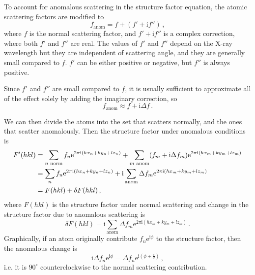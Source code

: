 \documentclass{article}
\theoremstyle{plain}\theoremheaderfont{\normalfont\itshape}\theorembodyfont{\rmfamily}\theoremseparator{.}\newtheorem*{rem}{Remark}\newtheorem*{ex}{Example}\newtheorem*{proof}{Proof}\newtheorem*{altp}{Alternative proof}
\theoremstyle{plain}\theoremheaderfont{\normalfont\bfseries}\theorembodyfont{\rmfamily}\theoremseparator{.}\newtheorem{thm}{Theorem}[section]\newtheorem{lem}[thm]{Lemma}\newtheorem{prop}[thm]{Proposition}\newtheorem*{cor}{Corollary}\newtheorem{defn}[thm]{Definition}\newtheorem{clm}[thm]{Claim}\newtheorem{clminproof}{Claim}\newtheorem*{law}{Law}\newtheorem{pos}[thm]{Postulate}
\theoremstyle{break}\theoremheaderfont{\normalfont\itshape}\theorembodyfont{\rmfamily}\theoremseparator{.\medskip}\newtheorem*{proofskip}{Proof}\newtheorem*{exs}{Examples}\newtheorem*{rems}{Remarks}
\theoremstyle{break}\theoremheaderfont{\normalfont\bfseries}\theorembodyfont{\rmfamily}\theoremseparator{.\medskip}\newtheorem{lemskip}[thm]{Lemma}\newtheorem{defnskip}[thm]{Definition}\newtheorem{propskip}[thm]{Proposition}\newtheorem{thmskip}[thm]{Theorem}
\numberwithin{equation}{section}
\newcommand{\ii}{\mathrm{i}}
\newcommand{\ee}{\mathrm{e}}
\begin{document}
    To account for anomalous scattering in the structure factor equation, the atomic scattering factors are modified to
    \begin{equation}
        f_{\text{anom}}=f+(f'+\ii f'')\,,
    \end{equation}
    where \(f\) is the normal scattering factor, and \(f'+\ii f''\) is a complex correction, where both \(f'\) and \(f''\) are real. The values of \(f'\) and \(f''\) depend on the X-ray wavelength but they are independent of scattering angle, and they are generally small compared to \(f\). \(f'\) can be either positive or negative, but \(f''\) is always positive.

    Since \(f'\) and \(f''\) are small compared to \(f\), it is usually sufficient to approximate all of the effect solely by adding the imaginary correction, so
    \begin{equation}
        f_{\text{anom}}\approx f+\ii\Delta f\,.
    \end{equation}

    We can then divide the atoms into the set that scatters normally, and the ones that scatter anomalously. Then the structure factor under anomalous conditions is
    \begin{align}
        F'(hkl)&=\sum_{n\text{ norm}}f_n \ee^{2\pi \ii(hx_n+ky_n+lz_n)}+\sum_{m\text{ anom}}(f_m+\ii\Delta f_m) \ee^{2\pi \ii(hx_m+ky_m+lz_m)}\notag\\
        &=\sum_{n}f_n \ee^{2\pi \ii(hx_n+ky_n+lz_n)} + \ii\sum_{\text{anom}}\Delta f_m \ee^{2\pi \ii(hx_m+ky_m+lz_m)}\notag \\
        &=F(hkl)+\delta F(hkl)\,,
    \end{align}
    where \(F(hkl)\) is the structure factor under normal scattering and change in the structure factor due to anomalous scattering is
    \begin{equation}
        \delta F(hkl)=\ii\sum_{\text{anom}}\Delta f_m \ee^{2\pi \ii(hx_m+ky_m+lz_m)}\,.
    \end{equation}
    Graphically, if an atom originally contribute \(f_n \ee^{\ii\phi}\) to the structure factor, then the anomalous change is
    \begin{equation}
        \ii\Delta f_n \ee^{\ii\phi}=\Delta f_n \ee^{\ii(\phi+\frac{\pi}{2})}\,,
    \end{equation}
    i.e. it is \(90^\circ\) counterclockwise to the normal scattering contribution.
\end{document}
